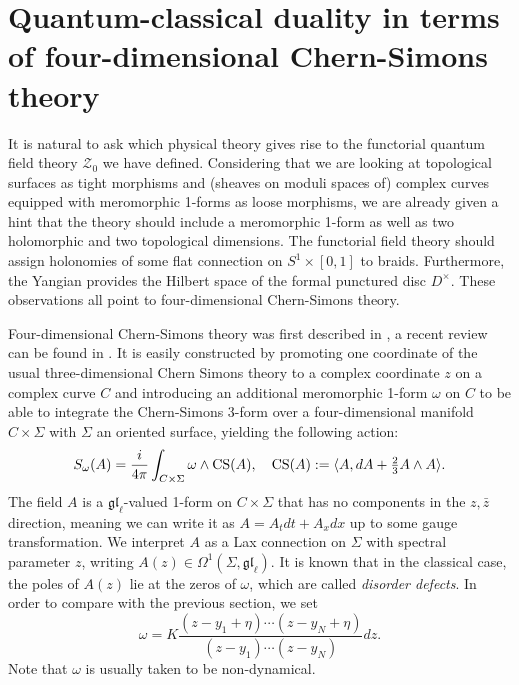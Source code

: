 \documentclass[11pt]{report}
\theoremstyle{definition}
\theoremstyle{remark}
\theoremstyle{remark}
\begin{document}
\section{Quantum-classical duality in terms of four-dimensional Chern-Simons theory}

It is natural to ask which physical theory gives rise to the functorial quantum field theory $\mathcal{Z}_0$ we have defined. Considering that we are looking at topological surfaces as tight morphisms and (sheaves on moduli spaces of) complex curves equipped with meromorphic 1-forms as loose morphisms, we are already given a hint that the theory should include a meromorphic 1-form as well as two holomorphic and two topological dimensions. The functorial field theory should assign holonomies of some flat connection on $S^1 \times [0,1]$ to braids. Furthermore, the Yangian provides the Hilbert space of the formal punctured disc $D^\times$. These observations all point to four-dimensional Chern-Simons theory.

Four-dimensional Chern-Simons theory was first described in \cite{article:costello:2013}, a recent review can be found in \cite{article:lacroix:2022}. It is easily constructed by promoting one coordinate of the usual three-dimensional Chern Simons theory to a complex coordinate $z$ on a complex curve $C$ and introducing an additional meromorphic 1-form $\omega$ on $C$ to be able to integrate the Chern-Simons 3-form over a four-dimensional manifold $C \times \Sigma$ with $\Sigma$ an oriented surface, yielding the following action:
\begin{equation*}
S_\omega(A) = \frac{i}{4\pi} \int_{C \times \Sigma} \omega \wedge \textnormal{CS}(A), \quad \textnormal{CS}(A) := \langle A, dA + \tfrac 23 A \wedge A \rangle.
\end{equation*}
The field $A$ is a $\mathfrak{gl}_\ell$-valued 1-form on $C \times \Sigma$ that has no components in the $z,\bar z$ direction, meaning we can write it as $A = A_t dt + A_x dx$ up to some gauge transformation. We interpret $A$ as a Lax connection on $\Sigma$ with spectral parameter $z$, writing $A(z) \in \Omega^1(\Sigma,\mathfrak{gl}_\ell)$. It is known \cite{article:lacroix:2021} that in the classical case, the poles of $A(z)$ lie at the zeros of $\omega$, which are called \emph{disorder defects}. In order to compare with the previous section, we set
\begin{equation*}
\omega = K\frac{(z-y_1+\eta) \cdots (z-y_N+\eta)}{(z-y_1) \cdots (z-y_N)} dz.
\end{equation*}
Note that $\omega$ is usually taken to be non-dynamical.
\end{document}
